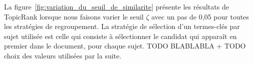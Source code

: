     La figure~\ref{fig:variation_du_seuil_de_similarite} présente les résultats
    de TopicRank lorsque nous faisons varier le seuil $\zeta$ avec un pas de
    0,05 pour toutes les stratégies de regroupement. La stratégie de sélection
    d'un termes-clés par sujet utilisée est celle qui consiste à sélectionner
    le candidat qui apparaît en premier dans le document, pour chaque sujet.
    TODO BLABLABLA + TODO choix des valeurs utilisées par la suite.
